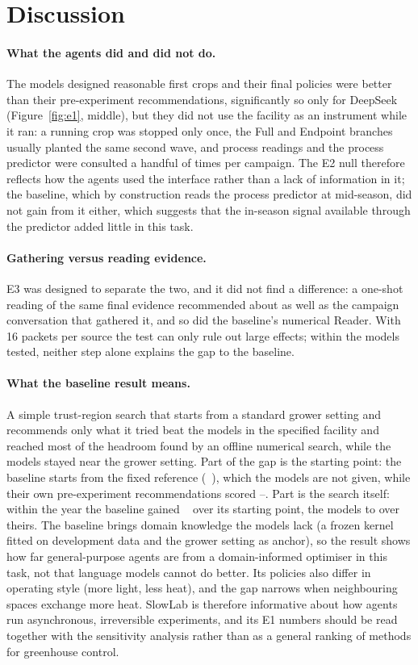 \section{Discussion}
\paragraph{What the agents did and did not do.} The models designed reasonable first crops and their final policies were better than their pre-experiment recommendations, significantly so only for DeepSeek (Figure~\ref{fig:e1}, middle), but they did not use the facility as an instrument while it ran: a running crop was stopped only once, the Full and Endpoint branches usually planted the same second wave, and process readings and the process predictor were consulted a handful of times per campaign. The E2 null therefore reflects how the agents used the interface rather than a lack of information in it; the baseline, which by construction reads the process predictor at mid-season, did not gain from it either, which suggests that the in-season signal available through the predictor added little in this task.

\paragraph{Gathering versus reading evidence.} E3 was designed to separate the two, and it did not find a difference: a one-shot reading of the same final evidence recommended about as well as the campaign conversation that gathered it, and so did the baseline's numerical Reader. With 16 packets per source the test can only rule out large effects; within the models tested, neither step alone explains the gap to the baseline.

\paragraph{What the baseline result means.} A simple trust-region search that starts from a standard grower setting and recommends only what it tried beat the models in the specified facility and reached most of the headroom found by an offline numerical search, while the models stayed near the grower setting. Part of the gap is the starting point: the baseline starts from the fixed reference (~\eur{}), which the models are not given, while their own pre-experiment recommendations scored --. Part is the search itself: within the year the baseline gained ~\eur{} over its starting point, the models  to  over theirs. The baseline brings domain knowledge the models lack (a frozen kernel fitted on development data and the grower setting as anchor), so the result shows how far general-purpose agents are from a domain-informed optimiser in this task, not that language models cannot do better. Its policies also differ in operating style (more light, less heat), and the gap narrows when neighbouring spaces exchange more heat. SlowLab is therefore informative about how agents run asynchronous, irreversible experiments, and its E1 numbers should be read together with the sensitivity analysis rather than as a general ranking of methods for greenhouse control.
